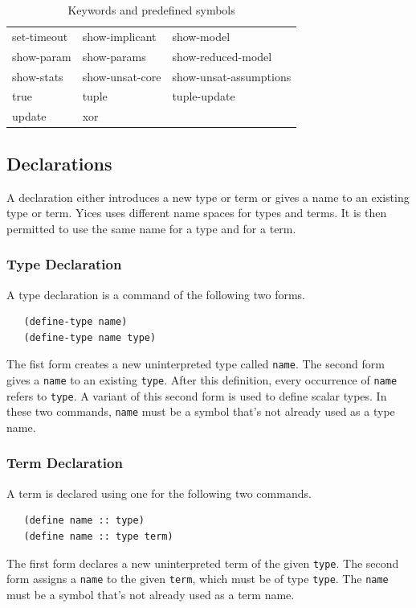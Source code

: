\documentclass[11pt,twoside,fleqn,openright,titlepage]{cslreport}
\begin{document}
\begin{table}
\begin{small}
\begin{center}
\begin{tt}
\begin{tabular}{|p{3.4cm}|p{3.4cm}|p{4.7cm}|}
set-timeout & show-implicant & show-model \\
show-param & show-params & show-reduced-model \\
show-stats & show-unsat-core & show-unsat-assumptions \\
true & tuple & tuple-update \\
update & xor &  \\
\hline
\end{tabular}
\end{tt}
\end{center}
\end{small}
\caption{Keywords and predefined symbols}
\label{syntax:keywords}
\end{table}


\subsection{Declarations}
\label{declarations}

A declaration either introduces a new type or term or gives a name to
an existing type or term. Yices uses different name spaces for types
and terms. It is then permitted to use the same name for a type and
for a term.


\subsubsection*{Type Declaration}

A type declaration is a command of the following two forms.
\begin{small}
\begin{verbatim}
   (define-type name)
   (define-type name type)
\end{verbatim}
\end{small}
The fist form creates a new uninterpreted type called
\texttt{name}. The second form gives a \texttt{name} to an
existing \texttt{type}. After this definition, every occurrence of
\texttt{name} refers to \texttt{type}. A variant of this second
form is used to define scalar types. In these two commands,
\texttt{name} must be a symbol that's not already used as a type
name.


\subsubsection*{Term Declaration}

A term is declared using one for the following two commands.
\begin{small}
\begin{verbatim}
   (define name :: type)
   (define name :: type term)
\end{verbatim}
\end{small}
The first form declares a new uninterpreted term of the given
\texttt{type}.  The second form assigns a \texttt{name} to the
given \texttt{term}, which must be of type \texttt{type}. The
\texttt{name} must be a symbol that's not already used as a term
name.
\end{document}

